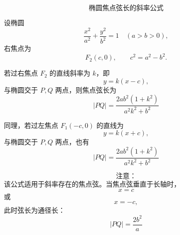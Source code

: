 \[
	\boxed{
		\text{椭圆焦点弦长的斜率公式}
	}
\]

设椭圆
\[
	\frac{x^2}{a^2}+\frac{y^2}{b^2}=1
	\quad (a>b>0),
\]
右焦点为
\[
	F_2(c,0),\qquad c^2=a^2-b^2.
\]

若过右焦点 \(F_2\) 的直线斜率为 \(k\)，即
\[
	y=k(x-c),
\]
与椭圆交于 \(P,Q\) 两点，则焦点弦长为
\[
	\boxed{
		|PQ|=\frac{2ab^2(1+k^2)}{a^2k^2+b^2}
	}
\]

同理，若过左焦点 \(F_1(-c,0)\) 的直线为
\[
	y=k(x+c),
\]
与椭圆交于 \(P,Q\) 两点，也有
\[
	\boxed{
		|PQ|=\frac{2ab^2(1+k^2)}{a^2k^2+b^2}
	}
\]

\[
	\textbf{注意：}
\]
该公式适用于斜率存在的焦点弦。当焦点弦垂直于长轴时，
\[
	x=c
\]
或
\[
	x=-c,
\]
此时弦长为通径长：
\[
	\boxed{
		|PQ|=\frac{2b^2}{a}
	}
\]